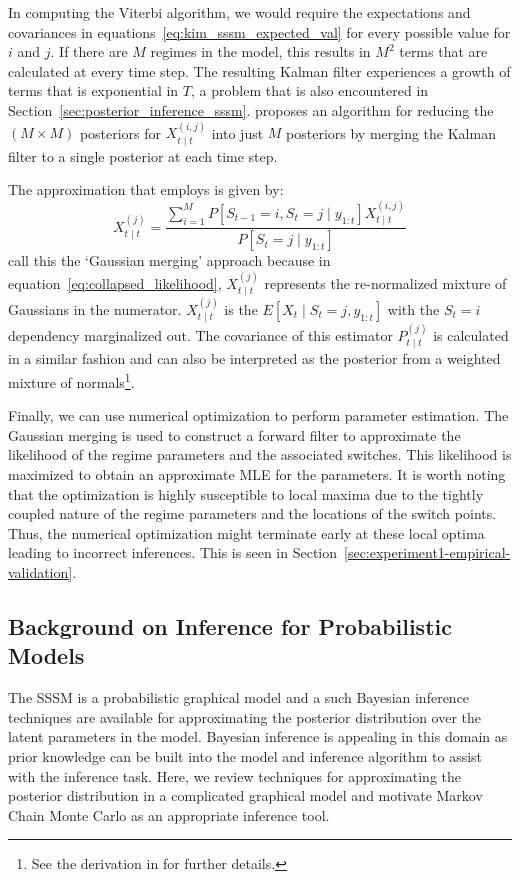 In computing the Viterbi algorithm, we would require the expectations and covariances in equations~\ref{eq:kim_sssm_expected_val} for every possible value for $i$ and $j$. If there are $M$ regimes in the model, this results in $M^2$ terms that are calculated at every time step. The resulting Kalman filter experiences a growth of terms that is exponential in $T$, a problem that is also encountered in Section~\ref{sec:posterior_inference_sssm}. \cite{kim1994dynamic} proposes an algorithm for reducing the $(M \times M)$ posteriors for $X_{t \mid t}^{(i,j)}$ into just $M$ posteriors by merging the Kalman filter to a single posterior at each time step.

The approximation that \cite{kim1994dynamic} employs is given by:
\begin{equation}\label{eq:collapsed_likelihood}
  X_{t \mid t}^{(j)} = \frac{\sum\limits_{i=1}^{M} P[S_{t-1}=i, S_t=j \mid y_{1:t}]X_{t \mid t}^{(i,j)}}{P[S_t = j \mid y_{1:t}]}
\end{equation}
\cite{ghahramani2000variational} call this the `Gaussian merging' approach because in equation~\ref{eq:collapsed_likelihood}, $X_{t \mid t}^{(j)}$ represents the re-normalized mixture of Gaussians in the numerator. $X_{t \mid t}^{(j)}$ is the $E[X_t \mid S_t = j, y_{1:t}]$ with the $S_t = i$ dependency marginalized out. The covariance of this estimator $P_{t \mid t}^{(j)}$ is calculated in a similar fashion and can also be interpreted as the posterior from a weighted mixture of normals\footnote{See the derivation in \cite{kim1994dynamic} for further details.}.

Finally, we can use numerical optimization to perform parameter estimation. The Gaussian merging is used to construct a forward filter to approximate the likelihood of the regime parameters and the associated switches. This likelihood is maximized to obtain an approximate MLE for the parameters. It is worth noting that the optimization is highly susceptible to local maxima due to the tightly coupled nature of the regime parameters and the locations of the switch points. Thus, the numerical optimization might terminate early at these local optima leading to incorrect inferences. This is seen in Section~\ref{sec:experiment1-empirical-validation}.

\subsection{Background on Inference for Probabilistic Models}
The SSSM is a probabilistic graphical model and a such Bayesian inference techniques are available for approximating the posterior distribution over the latent parameters in the model. Bayesian inference is appealing in this domain as prior knowledge can be built into the model and inference algorithm to assist with the inference task. Here, we review techniques for approximating the posterior distribution in a complicated graphical model and motivate Markov Chain Monte Carlo as an appropriate inference tool.

